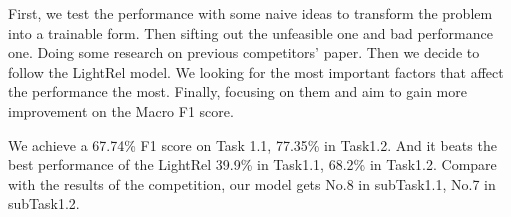 First, we test the performance with some naive ideas to transform the problem into a trainable form. Then sifting out the unfeasible one and bad performance one. Doing some research on previous competitors' paper. Then we decide to follow the LightRel model. We looking for the most important factors that affect the performance the most. Finally, focusing on them and aim to gain more improvement on the Macro F1 score.

We achieve a 67.74\% F1 score on Task 1.1, 77.35\% in Task1.2. And it beats the best performance of the LightRel 39.9\% in Task1.1, 68.2\% in Task1.2. Compare with the results of the competition, our model gets No.8 in subTask1.1, No.7 in subTask1.2.